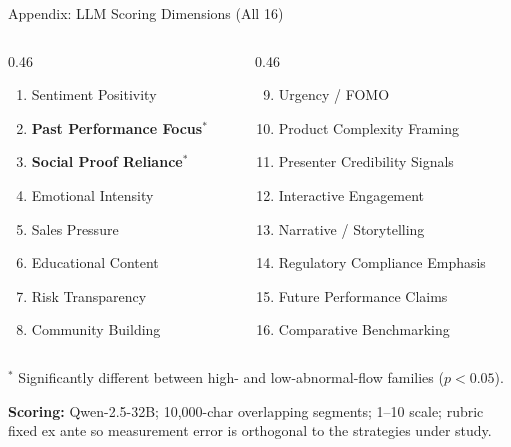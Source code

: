 \documentclass[11pt, aspectratio=169]{beamer}
\newcommand{\hl}[1]{\textcolor{myblue}{\textbf{#1}}}
\begin{document}

\begin{frame}{Appendix: LLM Scoring Dimensions (All 16)}

\begin{columns}[T]
\begin{column}{0.46\textwidth}
{\small
\begin{enumerate}
  \item Sentiment Positivity
  \item \hl{Past Performance Focus}$^*$
  \item \hl{Social Proof Reliance}$^*$
  \item Emotional Intensity
  \item Sales Pressure
  \item Educational Content
  \item Risk Transparency
  \item Community Building
\end{enumerate}}
\end{column}
\begin{column}{0.46\textwidth}
{\small
\begin{enumerate}
  \setcounter{enumi}{8}
  \item Urgency / FOMO
  \item Product Complexity Framing
  \item Presenter Credibility Signals
  \item Interactive Engagement
  \item Narrative / Storytelling
  \item Regulatory Compliance Emphasis
  \item Future Performance Claims
  \item Comparative Benchmarking
\end{enumerate}}
\end{column}
\end{columns}

\vspace{0.25cm}
{\small $^*$ Significantly different between high- and low-abnormal-flow families ($p < 0.05$).}

\vspace{0.15cm}
{\small \textbf{Scoring:} Qwen-2.5-32B; 10,000-char overlapping segments; 1--10 scale;
rubric fixed ex ante so measurement error is orthogonal to the strategies under study.}

\end{frame}
\end{document}
